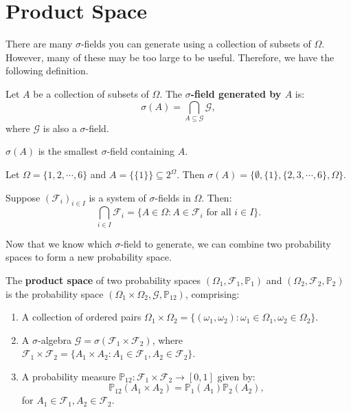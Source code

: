 \documentclass{huhtakm-template-book-v2}
\newcommand{\prob}{\mathbb{P}}
\begin{document}
\section{Product Space}
    There are many $\sigma$-fields you can generate using a collection of subsets of $\Omega$. However, many of these may be too large to be useful. Therefore, we have the following definition.
    \begin{defn}
        Let $A$ be a collection of subsets of $\Omega$. The \textbf{$\sigma$-field generated by $A$} is:
        \begin{equation*}
            \sigma(A) = \bigcap_{A\subseteq\mathcal{G}}\mathcal{G},
        \end{equation*}
        where $\mathcal{G}$ is also a $\sigma$-field. 
    \end{defn}
    \begin{rem}
        $\sigma(A)$ is the smallest $\sigma$-field containing $A$.
    \end{rem}
    \begin{eg}
        Let $\Omega = \{1,2,\cdots,6\}$ and $A = \{\{1\}\}\subseteq 2^{\Omega}$. Then $\sigma(A) = \{\emptyset,\{1\},\{2,3,\cdots,6\},\Omega\}$.
    \end{eg}
    \begin{cor}
        Suppose $(\mathcal{F}_{i})_{i \in I}$ is a system of $\sigma$-fields in $\Omega$. Then:
        \begin{equation*}
            \bigcap_{i \in I}\mathcal{F}_{i} = \{A \in \Omega: A \in \mathcal{F}_{i}\text{ for all }i \in I\}.
        \end{equation*}
    \end{cor}
    Now that we know which $\sigma$-field to generate, we can combine two probability spaces to form a new probability space.
    \begin{defn}
        The \textbf{product space} of two probability spaces $(\Omega_{1},\mathcal{F}_{1},\prob_{1})$ and $(\Omega_{2},\mathcal{F}_{2},\prob_{2})$ is the probability space $(\Omega_{1}\times\Omega_{2},\mathcal{G},\prob_{12})$, comprising:
        \begin{enumerate}
            \item A collection of ordered pairs $\Omega_{1}\times\Omega_{2} = \{(\omega_{1},\omega_{2}):\omega_{1} \in \Omega_{1},\omega_{2} \in \Omega_{2}\}$.
            \item A $\sigma$-algebra $\mathcal{G} = \sigma(\mathcal{F}_{1}\times\mathcal{F}_{2})$, where $\mathcal{F}_{1}\times\mathcal{F}_{2} = \{A_{1}\times A_{2}:A_{1} \in \mathcal{F}_{1},A_{2} \in \mathcal{F}_{2}\}$.
            \item A probability measure $\prob_{12}:\mathcal{F}_{1}\times\mathcal{F}_{2} \to [0,1]$ given by:
            \begin{equation*}
                \prob_{12}(A_{1}\times A_{2}) = \prob_{1}(A_{1})\prob_{2}(A_{2}),
            \end{equation*}
            for $A_{1} \in \mathcal{F}_{1},A_{2} \in \mathcal{F}_{2}$.
        \end{enumerate}
    \end{defn}
\end{document}
